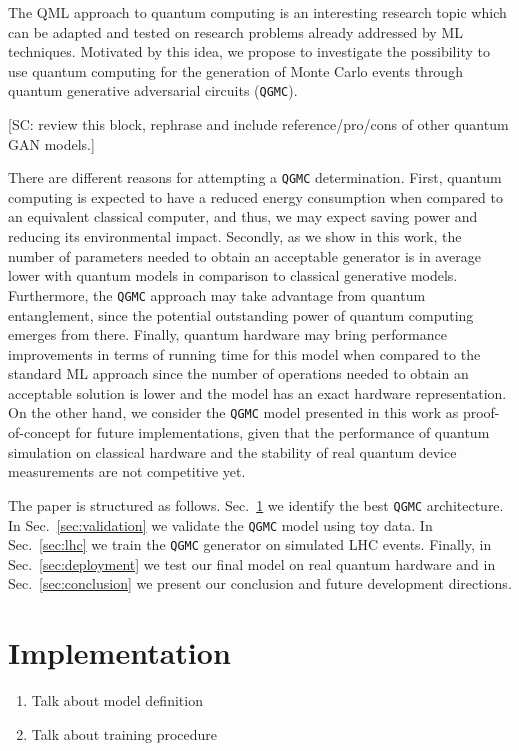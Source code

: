 \documentclass[twocolumn,preprintnumbers,superscriptaddress]{revtex4-2}
\begin{document}
The QML approach to quantum computing is an interesting research topic which can
be adapted and tested on research problems already addressed by ML techniques.
Motivated by this idea, we propose to investigate the possibility to use quantum
computing for the generation of Monte Carlo events through quantum generative
adversarial circuits ({\tt QGMC}).

{\color{red}[SC: review this block, rephrase and include reference/pro/cons of
other quantum GAN models.]}

There are different reasons for attempting a {\tt QGMC} determination. First,
quantum computing is expected to have a reduced energy consumption when compared
to an equivalent classical computer, and thus, we may expect saving power and
reducing its environmental impact. Secondly, as we show in this work, the number
of parameters needed to obtain an acceptable generator is in average lower with
quantum models in comparison to classical generative models. Furthermore, the
{\tt QGMC} approach may take advantage from quantum entanglement, since the
potential outstanding power of quantum computing emerges from there. Finally,
quantum hardware may bring performance improvements in terms of running time for
this model when compared to the standard ML approach since the number of
operations needed to obtain an acceptable solution is lower and the model has an
exact hardware representation. On the other hand, we consider the {\tt QGMC}
model presented in this work as proof-of-concept for future implementations,
given that the performance of quantum simulation on classical hardware and the
stability of real quantum device measurements are not competitive yet.

The paper is structured as follows. Sec.~\ref{sec:implementation} we identify
the best {\tt QGMC} architecture. In Sec.~\ref{sec:validation} we validate the
{\tt QGMC} model using toy data. In Sec.~\ref{sec:lhc} we train the {\tt QGMC}
generator on simulated LHC events. Finally, in Sec.~\ref{sec:deployment} we test
our final model on real quantum hardware and in Sec.~\ref{sec:conclusion} we
present our conclusion and future development directions.

\section{Implementation}
\label{sec:implementation}

\begin{enumerate}
  \item Talk about model definition
  \item Talk about training procedure
\end{enumerate}
\end{document}
